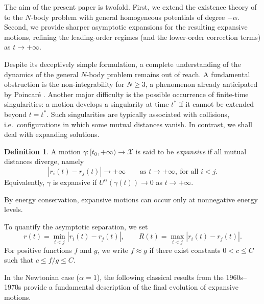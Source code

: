 \documentclass[a4paper,10pt]{amsart}
\theoremstyle{plain}
\theoremstyle{definition}
\newtheorem{defn}[thm]{Definition}
\numberwithin{equation}{section}
\numberwithin{thm}{section}
\begin{document}
The aim of the present paper is twofold. First, we extend the existence theory of \cite{PolimeniTerracini} to the $N$-body problem with general homogeneous potentials of degree $-\alpha$. Second, we provide sharper asymptotic expansions for the resulting expansive motions, refining the leading-order regimes (and the lower-order correction terms) as $t\to+\infty$.

\medskip

Despite its deceptively simple formulation, a complete understanding of the dynamics of the general $N$-body problem remains out of reach. A fundamental obstruction is the non-integrability for $N\ge 3$, a phenomenon already anticipated by Poincar\'e \cite{Poincare_SurLeProblemes}. Another major difficulty is the possible occurrence of finite-time singularities: a motion develops a singularity at time $t^*$ if it cannot be extended beyond $t=t^*$. Such singularities are typically associated with collisions, i.e.\ configurations in which some mutual distances vanish. In contrast, we shall deal with expanding solutions.

\begin{defn}\label{def:expansive}
A motion $\gamma:[t_0,+\infty)\to\mathcal{X}$ is said to be \emph{expansive} if all mutual distances diverge, namely
\[
|r_i(t)-r_j(t)|\longrightarrow+\infty
\qquad\text{as }t\to+\infty,\ \text{for all }i<j.
\]
Equivalently, $\gamma$ is expansive if $U^\alpha(\gamma(t))\to 0$ as $t\to+\infty$.
\end{defn}

By energy conservation, expansive motions can occur only at nonnegative energy levels.

To quantify the asymptotic separation, we set
\[
r(t)=\min_{i<j}|r_i(t)-r_j(t)|,
\qquad
R(t)=\max_{i<j}|r_i(t)-r_j(t)|.
\]
For positive functions $f$ and $g$, we write $f\approx g$ if there exist constants $0<c\le C$ such that
$c\le f/g\le C$.

In the Newtonian case ($\alpha=1$), the following classical results from the 1960s--1970s provide a fundamental description of the final evolution of expansive motions.
\end{document}
